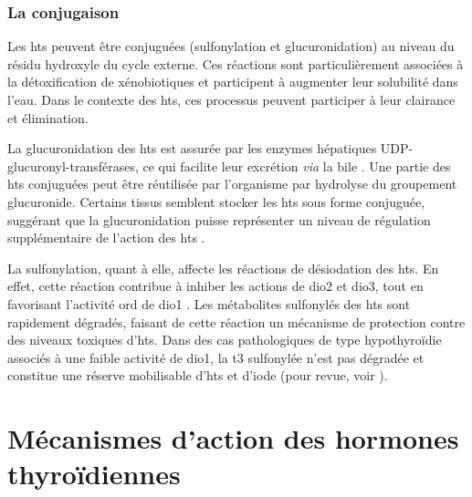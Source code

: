\documentclass[../main.tex]{subfiles}
\begin{document}
		\subsubsection{La conjugaison}
			Les \glspl{ht} peuvent être conjuguées (sulfonylation et glucuronidation) au niveau du résidu hydroxyle du cycle externe.
			Ces réactions sont particulièrement associées à la détoxification de xénobiotiques et participent à augmenter leur solubilité dans l'eau.
			Dans le contexte des \glspl{ht}, ces processus peuvent participer à leur clairance et élimination.
			\par
			La glucuronidation des \glspl{ht} est assurée par les enzymes hépatiques UDP-glucuronyl-transférases, ce qui facilite leur excrétion \textit{via} la bile \citep{Visser1996}.
			Une partie des \glspl{ht} conjuguées peut être réutilisée par l'organisme par hydrolyse du groupement glucuronide.
			Certains tissus semblent stocker les \glspl{ht} sous forme conjuguée, suggérant que la glucuronidation puisse représenter un niveau de régulation supplémentaire de l'action des \glspl{ht} \citep{VanderHeide2007}.
			\par
			La sulfonylation, quant à elle, affecte les réactions de désiodation des \glspl{ht}.
			En effet, cette réaction contribue à inhiber les actions de \gls{dio2} et \gls{dio3}, tout en favorisant l'activité \gls{ord} de \gls{dio1} \citep{Visser1990}.
			Les métabolites sulfonylés des \glspl{ht} sont rapidement dégradés, faisant de cette réaction un mécanisme de protection contre des niveaux toxiques d'\glspl{ht}.
			Dans des cas pathologiques de type hypothyroïdie associés à une faible activité de \gls{dio1}, la \gls{t3} sulfonylée n'est pas dégradée et constitue une réserve mobilisable d'\glspl{ht} et d'iode (pour revue, voir \citealp{Visser1994}).





\section{Mécanismes d'action des hormones thyroïdiennes}
\end{document}
